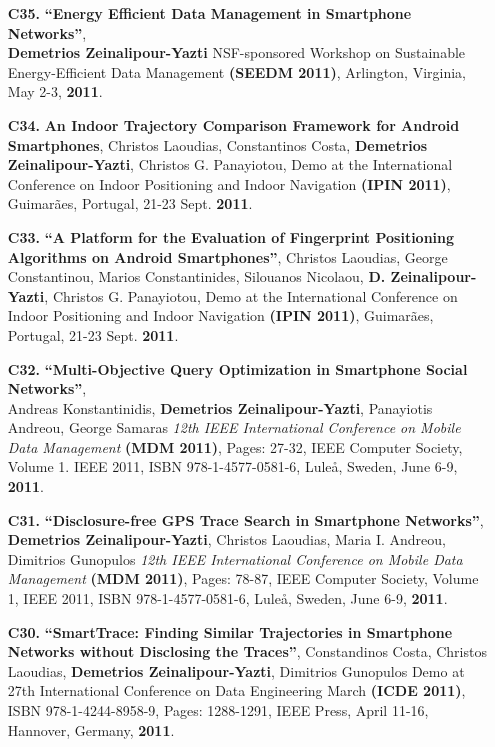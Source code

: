 \documentclass[10pt]{article}
\begin{document}
\begin{enumerate}
\item[{\bf C35.}] 
\label{C35}
{\bf ``Energy Efficient Data Management in Smartphone Networks''}, \\
{\bf Demetrios Zeinalipour-Yazti}
NSF-sponsored Workshop on Sustainable Energy-Efficient Data Management {\bf (SEEDM 2011)},
Arlington, Virginia, May 2-3, {\bf 2011}.

\item[{\bf C34.}] 
\label{C34}
{\bf An Indoor Trajectory Comparison Framework for Android Smartphones}, Christos Laoudias, Constantinos Costa, {\bf Demetrios Zeinalipour-Yazti}, Christos G. Panayiotou, Demo at the International Conference on Indoor Positioning and Indoor Navigation {\bf (IPIN 2011)}, Guimarães, Portugal, 21-23 Sept. {\bf 2011}.

\item[{\bf C33.}] 
\label{C33}
{\bf ``A Platform for the Evaluation of Fingerprint Positioning Algorithms on Android Smartphones''}, Christos Laoudias, George Constantinou, Marios Constantinides, Silouanos Nicolaou, {\bf D. Zeinalipour-Yazti}, Christos G. Panayiotou, Demo at the International Conference on Indoor Positioning and Indoor Navigation {\bf (IPIN 2011)}, Guimarães, Portugal, 21-23 Sept. {\bf 2011}.

\item[{\bf C32.}] 
\label{C32}
{\bf ``Multi-Objective Query Optimization in Smartphone Social Networks''}, \\
Andreas Konstantinidis, {\bf Demetrios Zeinalipour-Yazti}, Panayiotis Andreou, George Samaras 
{\em 12th IEEE International Conference on Mobile Data Management} {\bf (MDM 2011)}, Pages: 27-32, IEEE Computer Society, Volume 1. IEEE 2011, ISBN 978-1-4577-0581-6, Lule\aa, Sweden, June 6-9, {\bf 2011}.

\item[{\bf C31.}] 
\label{C31}
{\bf ``Disclosure-free GPS Trace Search in Smartphone Networks''}, \\
{\bf Demetrios Zeinalipour-Yazti}, Christos Laoudias, Maria I. Andreou, Dimitrios Gunopulos 
{\em 12th IEEE International Conference on Mobile Data Management} {\bf (MDM 2011)}, Pages: 78-87, IEEE Computer Society, Volume 1, IEEE 2011, ISBN 978-1-4577-0581-6, Lule\aa, Sweden, June 6-9, {\bf 2011}.

\item[{\bf C30.}] 
\label{C30}
{\bf ``SmartTrace: Finding Similar Trajectories in Smartphone Networks without Disclosing the Traces''}, 
Constandinos Costa, Christos Laoudias, {\bf Demetrios Zeinalipour-Yazti}, Dimitrios Gunopulos  
Demo at 27th International Conference on Data Engineering March {\bf (ICDE 2011)},  
ISBN 978-1-4244-8958-9, Pages: 1288-1291, IEEE Press, April 11-16, Hannover, Germany, {\bf 2011}.


\end{enumerate}
\end{document}
